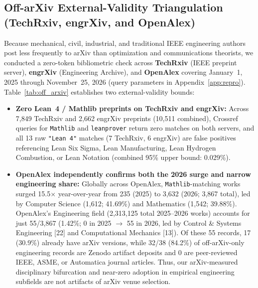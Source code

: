\documentclass[11pt,letterpaper]{article}
\begin{document}
\subsection{Off-arXiv External-Validity Triangulation (TechRxiv, engrXiv, and OpenAlex)}
\label{sec:off_arxiv}

Because mechanical, civil, industrial, and traditional IEEE engineering authors post less frequently to arXiv than optimization and communications theorists, we conducted a zero-token bibliometric check across \textbf{TechRxiv} (IEEE preprint server), \textbf{engrXiv} (Engineering Archive), and \textbf{OpenAlex} covering January~1, 2025 through November~25, 2026 (query parameters in Appendix~\ref{app:repro}). Table~\ref{tab:off_arxiv} establishes two external-validity bounds:
\begin{itemize}
  \item \textbf{Zero Lean~4 / Mathlib preprints on TechRxiv and engrXiv:} Across 7,849 TechRxiv and 2,662 engrXiv preprints (10,511 combined), Crossref queries for \texttt{Mathlib} and \texttt{leanprover} return zero matches on both servers, and all 13 raw \texttt{"Lean 4"} matches (7 TechRxiv, 6 engrXiv) are false positives referencing Lean Six Sigma, Lean Manufacturing, Lean Hydrogen Combustion, or Lean Notation (combined 95\% upper bound: 0.029\%).
  \item \textbf{OpenAlex independently confirms both the 2026 surge and narrow engineering share:} Globally across OpenAlex, \texttt{Mathlib}-matching works surged 15.5$\times$ year-over-year from 235 (2025) to 3,632 (2026; 3,867 total), led by Computer Science (1,612; 41.69\%) and Mathematics (1,542; 39.88\%). OpenAlex's Engineering field (2,313,125 total 2025--2026 works) accounts for just 55/3,867 (1.42\%; 0 in 2025 $\to$ 55 in 2026, led by Control \& Systems Engineering [22] and Computational Mechanics [13]). Of these 55 records, 17 (30.9\%) already have arXiv versions, while 32/38 (84.2\%) of off-arXiv-only engineering records are Zenodo artifact deposits and 0 are peer-reviewed IEEE, ASME, or Automatica journal articles. Thus, our arXiv-measured disciplinary bifurcation and near-zero adoption in empirical engineering subfields are not artifacts of arXiv venue selection.
\end{itemize}
\end{document}
